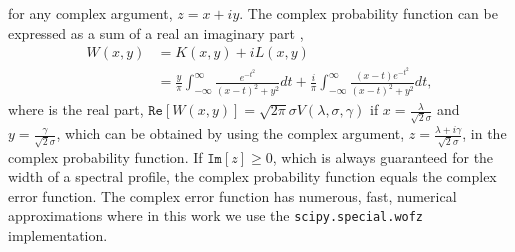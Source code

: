 \documentclass[a4paper,fleqn,usenatbib]{mnras}
\begin{document}
for any complex argument, $z = x + iy$. The complex probability function can be expressed as a sum of a real an imaginary part \citep{benner1995, abrarov2015b},
\begin{equation} 
	\begin{split}
		W(x, y)  
		& = K(x, y) + i L(x, y) \\
		& = \frac{y}{\pi}  \int_{-\infty}^{\infty} \frac{e^{- t^2 }}{(x -  t)^2 +y^2} dt  + \frac{i}{\pi}  \int_{-\infty}^{\infty} \frac{(x - t)e^{- t^2 }}{(x -  t)^2 +y^2} dt,
	\end{split}
\end{equation}
where is the real part, $\mathtt{Re}[W(x, y)] =  \sqrt{2 \pi} \sigma V(\lambda,\sigma, \gamma)$ if $x = \frac{\lambda}{\sqrt{2} \sigma}$ and $y = \frac{\gamma}{\sqrt{2} \sigma}$, which can be obtained by using the complex argument, $z = \frac{\lambda + i\gamma}{\sqrt{2} \sigma}$, in the complex probability function. If $\mathtt{Im}[z] \geq 0$, which is always guaranteed for the width of a spectral profile, the complex probability function equals the complex error function. The complex error function has numerous, fast, numerical approximations where in this work we use the \texttt{scipy.special.wofz} \citep{scipy} implementation.



\bsp	%
\label{lastpage}
\end{document}
